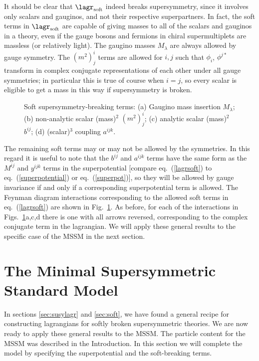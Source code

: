 It should be clear that $\lagr_{\rm soft}$ indeed breaks supersymmetry,
since it involves only scalars and gauginos, and not their respective
superpartners. In fact, the soft terms in $\lagr_{\rm soft}$ are capable
of giving masses to all of the scalars and gauginos in a theory, even if
the gauge bosons and fermions in chiral supermultiplets are massless
(or relatively light).
The gaugino masses $M_\lambda$ are always allowed by gauge symmetry.
The $(m^2)_j^i$ terms are allowed for $i,j$ such that $\phi_i$, $\phi^{j*}$
transform in complex conjugate representations of each other
under all gauge symmetries; in particular this
is true of course when $i=j$, so every scalar is eligible to get
a mass in this way if supersymmetry is broken.
\begin{figure}
\centerline{}
\caption{Soft supersymmetry-breaking terms:
(a) Gaugino mass insertion $M_\lambda$;
(b) non-analytic scalar (mass)$^2$ $(m^2)_j^i$;
(c) analytic scalar (mass)$^2$ $b^{ij}$;
(d) (scalar)$^3$ coupling $a^{ijk}$.
\label{fig:soft}}
\end{figure}
The remaining soft terms may or may not be allowed by the symmetries. In
this regard it
is useful to note that the
$b^{ij}$ and $a^{ijk}$ terms have the same form as the
$M^{ij}$ and $y^{ijk}$ terms in the superpotential
[compare eq.~(\ref{lagrsoft}) to eq.~(\ref{superpotential}) or
eq.~(\ref{superpot})], so they will be
allowed by gauge invariance
if and only if a corresponding superpotential term is allowed.
The Feynman diagram interactions corresponding to the allowed soft
terms in eq.~(\ref{lagrsoft}) are shown in Fig.~\ref{fig:soft}.
As before, for each of the interactions in Figs.~\ref{fig:soft}a,c,d
there is one
with all arrows reversed, corresponding to the complex conjugate
term in the lagrangian. We will apply these
general results to the specific case of the MSSM in the next section.

\section{The Minimal Supersymmetric Standard Model}\label{sec:mssm}
\setcounter{equation}{0}
\setcounter{footnote}{1}

In sections \ref{sec:susylagr} and \ref{sec:soft}, we have found a general
recipe for constructing
lagrangians for softly broken supersymmetric theories. We
are now ready to apply these general results to the MSSM.
The particle content for the MSSM was described
in the Introduction.
In this section we will complete the model by specifying the
superpotential and the soft-breaking terms.

